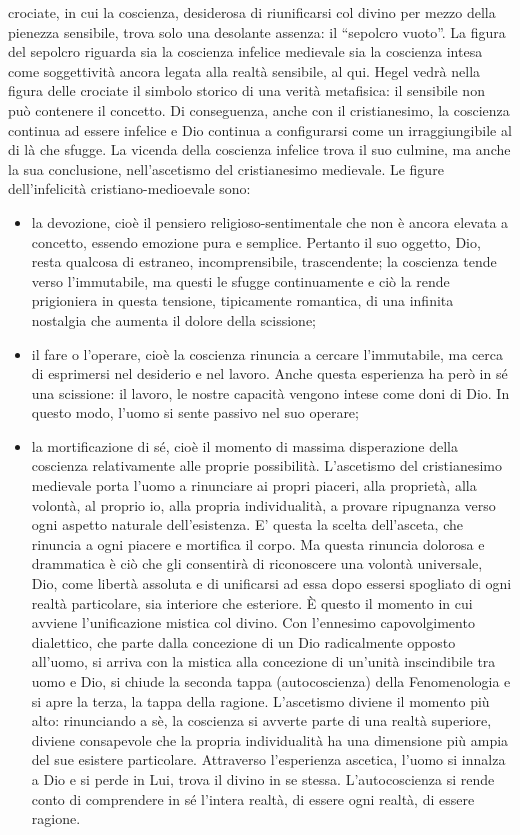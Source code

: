 \documentclass[a4paper,12pt,oneside,openany]{book}%
\begin{document}
crociate, in cui la coscienza, desiderosa di riunificarsi col divino per mezzo della pienezza sensibile, trova solo una desolante assenza: il “sepolcro vuoto”. La figura del sepolcro riguarda sia la coscienza infelice medievale sia la coscienza intesa come soggettività ancora legata alla realtà sensibile, al qui. Hegel vedrà nella figura delle crociate il simbolo storico di una verità metafisica: il sensibile non può contenere il concetto. Di conseguenza, anche con il cristianesimo, la coscienza continua ad essere infelice e Dio continua a configurarsi come un irraggiungibile al di là che sfugge. La vicenda della coscienza infelice trova il suo culmine, ma anche la sua conclusione, nell’ascetismo del cristianesimo medievale. Le figure dell’infelicità cristiano-medioevale sono:

\begin{itemize}
	\item la devozione, cioè il pensiero religioso-sentimentale che non è ancora elevata a concetto, essendo emozione pura e semplice. Pertanto il suo oggetto, Dio, resta qualcosa di estraneo, incomprensibile, trascendente; la coscienza tende verso l’immutabile, ma questi le sfugge continuamente e ciò la rende prigioniera in questa tensione, tipicamente romantica, di una infinita nostalgia che aumenta il dolore della scissione;
	\item il fare o l’operare, cioè la coscienza rinuncia a cercare l’immutabile, ma cerca di esprimersi nel desiderio e nel lavoro. Anche questa esperienza ha però in sé una scissione: il lavoro, le nostre capacità vengono intese come doni di Dio. In questo modo, l’uomo si sente passivo nel suo operare;
	\item la mortificazione di sé, cioè il momento di massima disperazione della coscienza relativamente alle proprie possibilità. L’ascetismo del cristianesimo medievale porta l’uomo a rinunciare ai propri piaceri, alla proprietà, alla volontà, al proprio io, alla propria individualità, a provare ripugnanza verso ogni aspetto naturale dell’esistenza. E’ questa la scelta dell’asceta, che rinuncia a ogni piacere e mortifica il corpo. Ma questa rinuncia dolorosa e drammatica è ciò che gli consentirà di riconoscere una volontà universale, Dio, come libertà assoluta e di unificarsi ad essa dopo essersi spogliato di ogni realtà particolare, sia interiore che esteriore. È questo il momento in cui avviene l’unificazione mistica col divino. Con l’ennesimo capovolgimento dialettico, che parte dalla concezione di un Dio radicalmente opposto all’uomo, si arriva con la mistica alla concezione di un’unità inscindibile tra uomo e Dio, si chiude la seconda tappa (autocoscienza) della Fenomenologia e si apre la terza, la tappa della ragione. L’ascetismo diviene il momento più alto: rinunciando a sè, la coscienza si avverte parte di una realtà superiore, diviene consapevole che la propria individualità ha una dimensione più ampia del sue esistere particolare. Attraverso l’esperienza ascetica, l’uomo si innalza a Dio e si perde in Lui, trova il divino in se stessa. L’autocoscienza si rende conto di comprendere in sé l’intera realtà, di essere ogni realtà, di essere ragione.
	
\end{itemize}	
	
\end{document}
